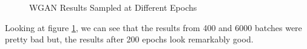 \documentclass[12pt,
 reprint,
nofootinbib,
 amsmath,amssymb,
 aps,
floatfix,
]{revtex4-2}
\begin{document}
\begin{figure}[h!]
    \centering
    \qquad
    \qquad
    \caption{WGAN Results Sampled at Different Epochs}%
    \label{fig:wganResults}%
\end{figure}

Looking at figure \ref{fig:wganResults}, we can see that the results from 400 and 6000 batches were pretty bad but, the results after 200 epochs look remarkably good.
\end{document}
